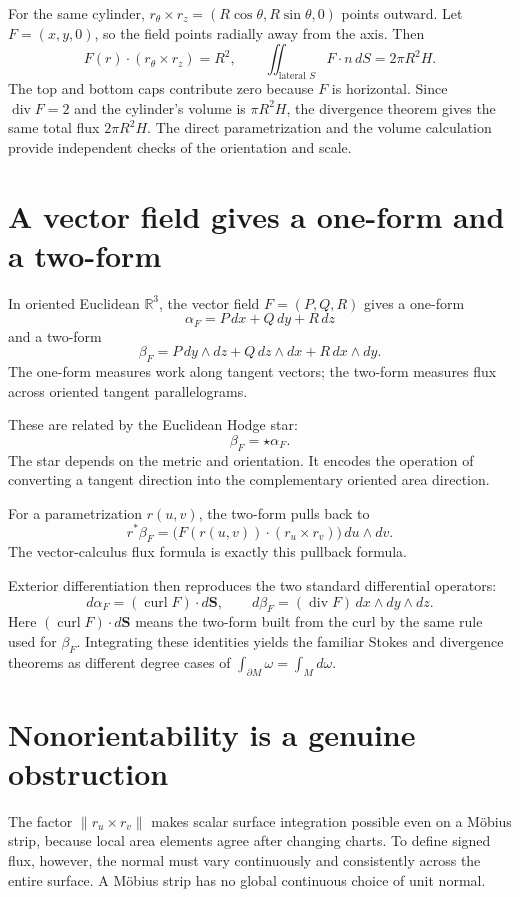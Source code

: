 For the same cylinder, \(r_\theta\times r_z=(R\cos\theta,R\sin\theta,0)\) points outward. Let \(F=(x,y,0)\), so the field points radially away from the axis. Then
\[
 F(r)\cdot(r_\theta\times r_z)=R^2,\qquad
 \boxed{\iint_{\text{lateral }S}F\cdot n\,dS=2\pi R^2H.}
\]
The top and bottom caps contribute zero because \(F\) is horizontal. Since \(\operatorname{div}F=2\) and the cylinder's volume is \(\pi R^2H\), the divergence theorem gives the same total flux \(2\pi R^2H\). The direct parametrization and the volume calculation provide independent checks of the orientation and scale.

\section{A vector field gives a one-form and a two-form}

In oriented Euclidean \(\mathbb R^3\), the vector field \(F=(P,Q,R)\) gives a one-form
\[
 \alpha_F=P\,dx+Q\,dy+R\,dz
\]
and a two-form
\[
 \beta_F=P\,dy\wedge dz+Q\,dz\wedge dx+R\,dx\wedge dy.
\]
The one-form measures work along tangent vectors; the two-form measures flux across oriented tangent parallelograms.

These are related by the Euclidean Hodge star:
\[
 \boxed{\beta_F=\star\alpha_F.}
\]
The star depends on the metric and orientation. It encodes the operation of converting a tangent direction into the complementary oriented area direction.

For a parametrization \(r(u,v)\), the two-form pulls back to
\[
 r^*\beta_F=
 \bigl(F(r(u,v))\cdot(r_u\times r_v)\bigr)\,du\wedge dv.
\]
The vector-calculus flux formula is exactly this pullback formula.

Exterior differentiation then reproduces the two standard differential operators:
\[
 d\alpha_F=(\operatorname{curl}F)\cdot d\mathbf S,
 \qquad
 d\beta_F=(\operatorname{div}F)\,dx\wedge dy\wedge dz.
\]
Here \((\operatorname{curl}F)\cdot d\mathbf S\) means the two-form built from the curl by the same rule used for \(\beta_F\). Integrating these identities yields the familiar Stokes and divergence theorems as different degree cases of \(\int_{\partial M}\omega=\int_Md\omega\).

\section{Nonorientability is a genuine obstruction}

The factor \(\|r_u\times r_v\|\) makes scalar surface integration possible even on a Möbius strip, because local area elements agree after changing charts. To define signed flux, however, the normal must vary continuously and consistently across the entire surface. A Möbius strip has no global continuous choice of unit normal.

